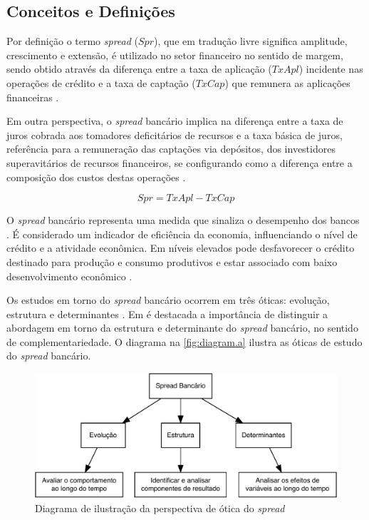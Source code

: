 \documentclass[
  12pt,
  12pt,
  openright,
  oneside,
  a4paper,
  chapter=TITLE,
  section=TITLE,
  subsection=TITLE,
  subsubsection=TITLE,
  english,
  portugues,
  sumario=tradicional]{abntex2}
\begin{document}
\subsection{Conceitos e Definições}

Por definição o termo \emph{spread} (\(Spr\)), que em tradução livre significa amplitude, crescimento e extensão, é utilizado no setor financeiro no sentido de margem, sendo obtido através da diferença entre a taxa de aplicação (\(TxApl\)) incidente nas operações de crédito e a taxa de captação (\(TxCap\)) que remunera as aplicações financeiras \cite{BCB:2000, BCB:1999}.

Em outra perspectiva, o \emph{spread} bancário implica na diferença entre a taxa de juros cobrada aos tomadores deficitários de recursos e a taxa básica de juros, referência para a remuneração das captações via depósitos, dos investidores superavitários de recursos financeiros, se configurando como a diferença entre a composição dos custos destas operações \cite{BCB:1999}.

\begin{equation}
Spr = TxApl - TxCap
\end{equation}

O \emph{spread} bancário representa uma medida que sinaliza o desempenho dos bancos \cite{levine:1997}. É considerado um indicador de eficiência da economia, influenciando o nível de crédito e a atividade econômica. Em níveis elevados pode desfavorecer o crédito destinado para produção e consumo produtivos e estar associado com baixo desenvolvimento econômico \cite{WB:2005}.

Os estudos em torno do \emph{spread} bancário ocorrem em três óticas: evolução, estrutura e determinantes \cite{dick:1999}. Em \textcite{dick:1999} é destacada a importância de distinguir a abordagem em torno da estrutura e determinante do \emph{spread} bancário, no sentido de complementariedade. O diagrama na \autoref{fig:diagram.a} ilustra as óticas de estudo do \emph{spread} bancário.

\begin{figure}[!htbp]
\vspace{20pt}
\caption{Diagrama de ilustração da perspectiva de ótica do \emph{spread}}
\vspace{-4mm}

\begin{center}\includegraphics{12-exportedfigures/diagram.spread.otic-1} \end{center}
\vspace{-3mm}
\label{fig:diagram.a}
\vspace{-2mm}
\end{figure}
\end{document}

